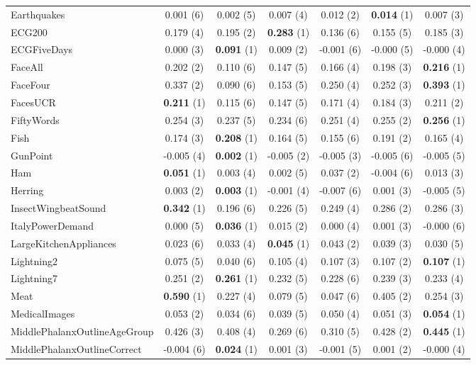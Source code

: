 \begin{table}[ht]
\begin{adjustbox}{width=\textwidth}
\begin{tabular}{lcccccc}
Earthquakes & 0.001 (6) & 0.002 (5) & 0.007 (4) & 0.012 (2) & \textbf{0.014} (1) & 0.007 (3) \\
ECG200 & 0.179 (4) & 0.195 (2) & \textbf{0.283} (1) & 0.136 (6) & 0.155 (5) & 0.185 (3) \\
ECGFiveDays & 0.000 (3) & \textbf{0.091} (1) & 0.009 (2) & -0.001 (6) & -0.000 (5) & -0.000 (4) \\
FaceAll & 0.202 (2) & 0.110 (6) & 0.147 (5) & 0.166 (4) & 0.198 (3) & \textbf{0.216} (1) \\
FaceFour & 0.337 (2) & 0.090 (6) & 0.153 (5) & 0.250 (4) & 0.252 (3) & \textbf{0.393} (1) \\
FacesUCR & \textbf{0.211} (1) & 0.115 (6) & 0.147 (5) & 0.171 (4) & 0.184 (3) & 0.211 (2) \\
FiftyWords & 0.254 (3) & 0.237 (5) & 0.234 (6) & 0.251 (4) & 0.255 (2) & \textbf{0.256} (1) \\
Fish & 0.174 (3) & \textbf{0.208} (1) & 0.164 (5) & 0.155 (6) & 0.191 (2) & 0.165 (4) \\
GunPoint & -0.005 (4) & \textbf{0.002} (1) & -0.005 (2) & -0.005 (3) & -0.005 (6) & -0.005 (5) \\
Ham & \textbf{0.051} (1) & 0.003 (4) & 0.002 (5) & 0.037 (2) & -0.004 (6) & 0.013 (3) \\
Herring & 0.003 (2) & \textbf{0.003} (1) & -0.001 (4) & -0.007 (6) & 0.001 (3) & -0.005 (5) \\
InsectWingbeatSound & \textbf{0.342} (1) & 0.196 (6) & 0.226 (5) & 0.249 (4) & 0.286 (2) & 0.286 (3) \\
ItalyPowerDemand & 0.000 (5) & \textbf{0.036} (1) & 0.015 (2) & 0.000 (4) & 0.001 (3) & -0.000 (6) \\
LargeKitchenAppliances & 0.023 (6) & 0.033 (4) & \textbf{0.045} (1) & 0.043 (2) & 0.039 (3) & 0.030 (5) \\
Lightning2 & 0.075 (5) & 0.040 (6) & 0.105 (4) & 0.107 (3) & 0.107 (2) & \textbf{0.107} (1) \\
Lightning7 & 0.251 (2) & \textbf{0.261} (1) & 0.232 (5) & 0.228 (6) & 0.239 (3) & 0.233 (4) \\
Meat & \textbf{0.590} (1) & 0.227 (4) & 0.079 (5) & 0.047 (6) & 0.405 (2) & 0.254 (3) \\
MedicalImages & 0.053 (2) & 0.034 (6) & 0.039 (5) & 0.050 (4) & 0.051 (3) & \textbf{0.054} (1) \\
MiddlePhalanxOutlineAgeGroup & 0.426 (3) & 0.408 (4) & 0.269 (6) & 0.310 (5) & 0.428 (2) & \textbf{0.445} (1) \\
MiddlePhalanxOutlineCorrect & -0.004 (6) & \textbf{0.024} (1) & 0.001 (3) & -0.001 (5) & 0.001 (2) & -0.000 (4) \\

\end{tabular}
\end{adjustbox}
\end{table}
